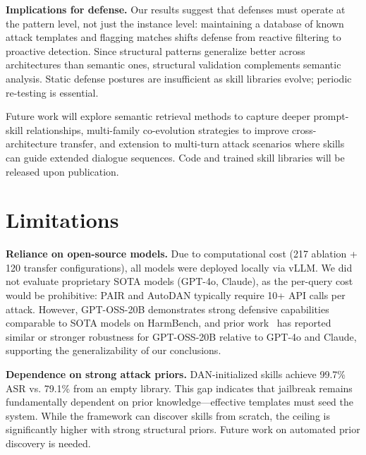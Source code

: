 \documentclass[letterpaper]{article}
\begin{document}
\textbf{Implications for defense.} Our results suggest that defenses must operate at the pattern level, not just the instance level: maintaining a database of known attack templates and flagging matches shifts defense from reactive filtering to proactive detection. Since structural patterns generalize better across architectures than semantic ones, structural validation complements semantic analysis. Static defense postures are insufficient as skill libraries evolve; periodic re-testing is essential.

Future work will explore semantic retrieval methods to capture deeper prompt-skill relationships, multi-family co-evolution strategies to improve cross-architecture transfer, and extension to multi-turn attack scenarios where skills can guide extended dialogue sequences. Code and trained skill libraries will be released upon publication.

\newpage
\section{Limitations}

\textbf{Reliance on open-source models.} Due to computational cost (217 ablation + 120 transfer configurations), all models were deployed locally via vLLM. We did not evaluate proprietary SOTA models (GPT-4o, Claude), as the per-query cost would be prohibitive: PAIR and AutoDAN typically require 10+ API calls per attack. However, GPT-OSS-20B demonstrates strong defensive capabilities comparable to SOTA models on HarmBench, and prior work~\citep{belaire2025automatic,wei2025learning} has reported similar or stronger robustness for GPT-OSS-20B relative to GPT-4o and Claude, supporting the generalizability of our conclusions.

\textbf{Dependence on strong attack priors.} DAN-initialized skills achieve 99.7\% ASR vs. 79.1\% from an empty library. This gap indicates that jailbreak remains fundamentally dependent on prior knowledge---effective templates must seed the system. While the framework can discover skills from scratch, the ceiling is significantly higher with strong structural priors. Future work on automated prior discovery is needed.



\appendix
\end{document}
